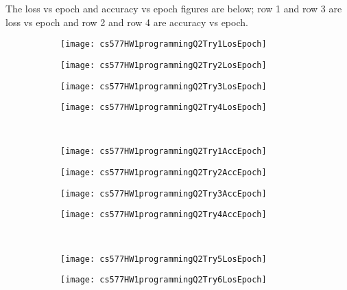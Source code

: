 \documentclass{article}
\begin{document}
The loss vs epoch and accuracy vs epoch figures are below; row 1 and row 3 are loss vs epoch and row 2 and row 4 are accuracy vs epoch.

\begin{figure}[h!]
    \centering
    \begin{subfigure}{.24\textwidth}
        \centering
        \texttt{[image: cs577HW1programmingQ2Try1LosEpoch]}
    \end{subfigure}
    \begin{subfigure}{.24\textwidth}
        \centering
        \texttt{[image: cs577HW1programmingQ2Try2LosEpoch]}
    \end{subfigure}
    \begin{subfigure}{.24\textwidth}
        \centering
        \texttt{[image: cs577HW1programmingQ2Try3LosEpoch]}
    \end{subfigure}
    \begin{subfigure}{.24\textwidth}
        \centering
        \texttt{[image: cs577HW1programmingQ2Try4LosEpoch]}
    \end{subfigure}\\
    \begin{subfigure}{.24\textwidth}
        \centering
        \texttt{[image: cs577HW1programmingQ2Try1AccEpoch]}
    \end{subfigure}
    \begin{subfigure}{.24\textwidth}
        \centering
        \texttt{[image: cs577HW1programmingQ2Try2AccEpoch]}
    \end{subfigure}
    \begin{subfigure}{.24\textwidth}
        \centering
        \texttt{[image: cs577HW1programmingQ2Try3AccEpoch]}
    \end{subfigure}
    \begin{subfigure}{.24\textwidth}
        \centering
        \texttt{[image: cs577HW1programmingQ2Try4AccEpoch]}
    \end{subfigure}\\
    \begin{subfigure}{.24\textwidth}
        \centering
        \texttt{[image: cs577HW1programmingQ2Try5LosEpoch]}
    \end{subfigure}
    \begin{subfigure}{.24\textwidth}
        \centering
        \texttt{[image: cs577HW1programmingQ2Try6LosEpoch]}

\end{subfigure}
\end{figure}
\end{document}
